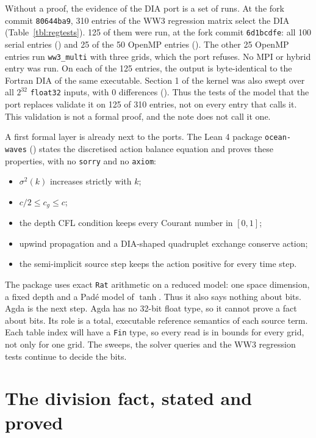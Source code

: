\documentclass[10pt,a4paper,]{article}
\providecommand{\tightlist}{\setlength{\itemsep}{0pt}\setlength{\parskip}{0pt}}
\begin{document}
Without a proof, the evidence of the DIA port is a set of runs. At the
fork commit \texttt{80644ba9}, 310 entries of the WW3 regression matrix
select the DIA (Table~\ref{tbl:regtests}). 125 of them were run, at the
fork commit \texttt{6d1bcdfe}: all 100 serial entries
() and 25 of the 50 OpenMP
entries (). The other 25 OpenMP
entries run \texttt{ww3\_multi} with three grids, which the port
refuses. No MPI or hybrid entry was run. On each of the 125 entries, the
output is byte-identical to the Fortran DIA of the same executable.
Section 1 of the kernel was also swept over all \(2^{32}\)
\texttt{float32} inputs, with 0 differences
(). Thus the tests of the model
that the port replaces validate it on 125 of 310 entries, not on every
entry that calls it. This validation is not a formal proof, and the note
does not call it one.

A first formal layer is already next to the ports. The Lean 4 package
\texttt{ocean-waves} () states
the discretised action balance equation and proves these properties,
with no \texttt{sorry} and no \texttt{axiom}:

\begin{itemize}
\tightlist
\item
  \(\sigma^2(k)\) increases strictly with \(k\);
\item
  \(c/2 \le c_g \le c\);
\item
  the depth CFL condition keeps every Courant number in \([0, 1]\);
\item
  upwind propagation and a DIA-shaped quadruplet exchange conserve
  action;
\item
  the semi-implicit source step keeps the action positive for every time
  step.
\end{itemize}

The package uses exact \texttt{Rat} arithmetic on a reduced model: one
space dimension, a fixed depth and a Padé model of \(\tanh\). Thus it
also says nothing about bits. Agda is the next step. Agda has no 32-bit
float type, so it cannot prove a fact about bits. Its role is a total,
executable reference semantics of each source term. Each table index
will have a \texttt{Fin} type, so every read is in bounds for every
grid, not only for one grid. The sweeps, the solver queries and the WW3
regression tests continue to decide the bits.

\section{The division fact, stated and proved}\label{sec:division}
\end{document}
